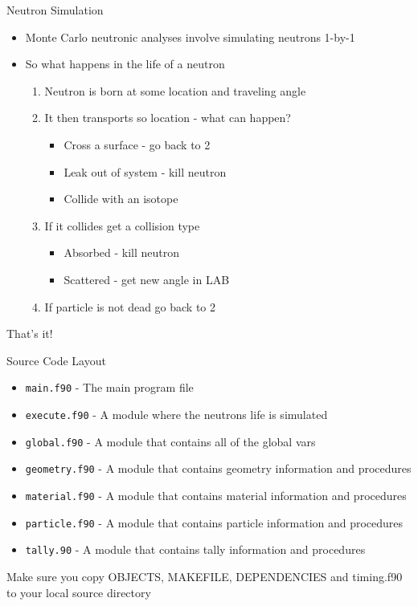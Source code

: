 \documentclass{beamer}
\begin{document}
\begin{frame}{Neutron Simulation}

  \begin{itemize}
    \item Monte Carlo neutronic analyses involve simulating neutrons 1-by-1
    \vfill\item So what happens in the life of a neutron
    \begin{enumerate}
      \vfill\item Neutron is born at some location and traveling angle
      \vfill\item It then transports so location - what can happen?
      \begin{itemize}
	\item Cross a surface - go back to 2
	\item Leak out of system - kill neutron
	\item Collide with an isotope
      \end{itemize}
      \vfill\item If it collides get a collision type
      \begin{itemize}
	\item Absorbed - kill neutron
	\item Scattered - get new angle in LAB
      \end{itemize}
      \vfill\item If particle is not dead go back to 2
    \end{enumerate}
  \end{itemize}
  \vfill
  \begin{center}\alert{That's it!}\end{center}
\end{frame}
\begin{frame}{Source Code Layout}

  \begin{itemize}
    \item \texttt{main.f90} - The main program file
    \vfill \item \texttt{execute.f90} - A module where the neutrons life is simulated
    \vfill \item \texttt{global.f90} - A module that contains all of the global vars
    \vfill \item \texttt{geometry.f90} - A module that contains geometry information and procedures
    \vfill \item \texttt{material.f90} - A module that contains material information and procedures
    \vfill \item \texttt{particle.f90} - A module that contains particle information and procedures
    \vfill \item \texttt{tally.90} - A module that contains tally information and procedures
  \end{itemize}
  \vfill
  \alert{Make sure you copy OBJECTS, MAKEFILE, DEPENDENCIES and timing.f90 to your local source directory}

\end{frame}
\end{document}
